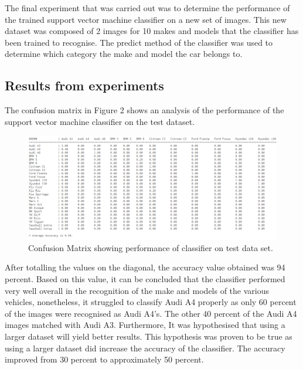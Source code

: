 \documentclass[a4paper, 12pt]{article}
\begin{document}
The final experiment that was carried out was to determine the performance of the trained support vector machine classifier on a new set of images. This new dataset was composed of 2 images for 10 makes and models that the classifier has been trained to recognise. The predict method of the classifier was used to determine which category the make and model the car belongs to. 


\subsection{ Results from experiments }

The confusion matrix in Figure 2 shows an analysis of the performance of the support vector machine classifier on the test dataset. 

\begin{figure}[!htb] 
  \includegraphics[scale=0.4]{confmatrix.png}
  \begin{center}
  	\caption{Confusion Matrix showing performance of classifier on test data set.}
  \end{center} 
  \label{fig:confmatrix} 
\end{figure}

After totalling the values on the diagonal, the accuracy value obtained was 94 percent. Based on this value, it can be concluded that the classifier performed very well overall in the recognition of the make and models of the various vehicles, nonetheless, it struggled to classify Audi A4 properly as only 60 percent of the images were recognised as Audi A4's. The other 40 percent of the Audi A4 images matched with Audi A3. Furthermore, It was hypothesised that using a larger dataset will yield better results. This hypothesis was proven to be true as using a larger dataset did increase the accuracy of the classifier. The accuracy improved from 30 percent to approximately 50 percent. 
\end{document}
